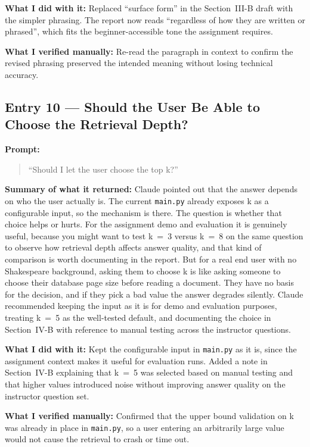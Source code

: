 \documentclass[10pt,conference]{IEEEtran}
\begin{document}
\textbf{What I did with it:}
Replaced ``surface form'' in the Section~III-B draft with the simpler
phrasing. The report now reads ``regardless of how they are written or
phrased'', which fits the beginner-accessible tone the assignment
requires.

\textbf{What I verified manually:}
Re-read the paragraph in context to confirm the revised phrasing
preserved the intended meaning without losing technical accuracy.

\subsection*{Entry 10 --- Should the User Be Able to Choose the Retrieval Depth?}

\textbf{Prompt:}
\begin{quote}
``Should I let the user choose the top k?''
\end{quote}

\textbf{Summary of what it returned:}
Claude pointed out that the answer depends on who the user actually is.
The current \texttt{main.py} already exposes k as a configurable input,
so the mechanism is there. The question is whether that choice helps or
hurts. For the assignment demo and evaluation it is genuinely useful,
because you might want to test k~=~3 versus k~=~8 on the same question
to observe how retrieval depth affects answer quality, and that kind of
comparison is worth documenting in the report. But for a real end user
with no Shakespeare background, asking them to choose k is like asking
someone to choose their database page size before reading a document.
They have no basis for the decision, and if they pick a bad value the
answer degrades silently. Claude recommended keeping the input as it is
for demo and evaluation purposes, treating k~=~5 as the well-tested
default, and documenting the choice in Section~IV-B with reference to
manual testing across the instructor questions.

\textbf{What I did with it:}
Kept the configurable input in \texttt{main.py} as it is, since the
assignment context makes it useful for evaluation runs. Added a note
in Section~IV-B explaining that k~=~5 was selected based on manual
testing and that higher values introduced noise without improving answer
quality on the instructor question set.

\textbf{What I verified manually:}
Confirmed that the upper bound validation on k was already in place in
\texttt{main.py}, so a user entering an arbitrarily large value would
not cause the retrieval to crash or time out.


\end{document}

